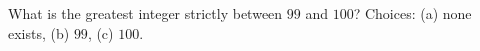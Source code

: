 What is the greatest integer strictly between $99$ and $100$? Choices: (a) none exists, (b) $99$, (c) $100$.
